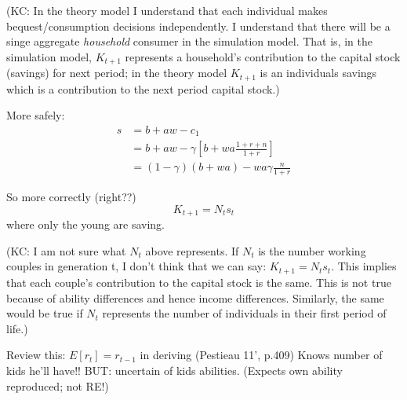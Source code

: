 \documentclass{article}
\begin{document}
(KC: In the theory model I understand that each individual makes bequest/consumption decisions independently.  I understand that there will be a singe aggregate \emph{household} consumer in the simulation model.  That is, in the simulation model, $K_{t+1}$ represents a household's contribution to the capital stock (savings) for next period; in the theory model $K_{t+1}$ is an individuals savings which is a contribution to the next period capital stock.)\newline

More safely:
\begin{equation}
\begin{split}
s
&= b + aw - c_{1}
\\
&= b + aw - \gamma[b + wa \frac{1+r+n}{1+r}]
\\
&= (1-\gamma)(b+wa) - wa \gamma \frac{n}{1+r}
\end{split}
\end{equation}

So more correctly (right??)  %
\begin{equation}
K_{t+1} = N_{t} s_{t}
\end{equation}
where only the young are saving.\newline

(KC: I am not sure what $N_{t}$ above represents.  If $N_t$ is the number working couples in generation t, I don't think that we can say: $K_{t+1} = N_{t} s_{t}$.  This implies that each couple's contribution to the capital stock is the same.  This is not true because of ability differences and hence income differences. Similarly, the same would be true if $N_{t}$ represents the number of individuals in their first period of life.)\newline




Review this:
$E[r_t] = r_{t-1}$ in deriving (Pestieau 11',  p.409)
Knows number of kids he'll have!!
BUT: uncertain of kids abilities.
(Expects own ability reproduced; not RE!)\newline
\end{document}
